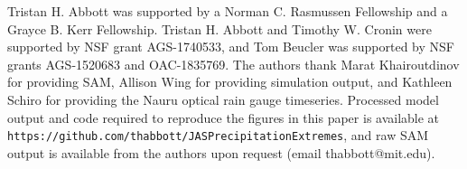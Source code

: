 \documentclass[twocol]{ametsoc}
\begin{document}
%

\acknowledgments
Tristan H. Abbott was supported by a Norman C. Rasmussen Fellowship and a Grayce B. Kerr Fellowship. Tristan H. Abbott and Timothy W. Cronin were supported by NSF grant AGS-1740533, and Tom Beucler was supported by NSF grants AGS-1520683 and OAC-1835769. The authors thank Marat Khairoutdinov for providing SAM, Allison Wing for providing simulation output, and Kathleen Schiro for providing the Nauru optical rain gauge timeseries. Processed model output and code required to reproduce the figures in this paper is available at {\tt https://github.com/thabbott/JASPrecipitationExtremes}, and raw SAM output is available from the authors upon request (email thabbott@mit.edu).

%






%
%
%
\end{document}
